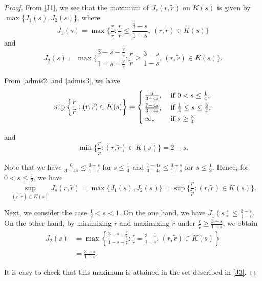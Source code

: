 \documentclass[letterpaper, 11pt,  reqno]{amsart}
\newcommand{\1}{\hspace{0.5mm}\text{I}\hspace{0.5mm}}
\newcommand{\noi}{\noindent}
\newcommand{\wt}{\widetilde}
\numberwithin{equation}{section}
\numberwithin{theorem}{section}
\begin{document}
  
 \begin{proof} 
From \eqref{J1}, we see that 
the maximum of $J_s(r, \wt r)$ on $K(s)$ is given by $\max\{J_1(s),J_2(s) \}$, 
where 
\[ J_1(s)= \max \bigg\{ \frac{r}{\wt r} : \frac{r}{\wt r} \le \frac{3-s}{1-s}, \, (r,\wt r) \in K(s) \bigg\} \] 
and 
\[J_2(s) = \max \bigg\{ \frac{3-s-\frac2{\wt r}}{1-s-\frac2{r}} :   
 \frac{r}{\wt r} \ge \frac{3-s}{1-s}, \, (r,\wt r ) \in K(s) \bigg\}. \]  


From \eqref{admis2} and \eqref{admis3}, we have
\[ \sup\bigg\{ \frac{r}{\wt r}: (r,\wt r) \in K(s) \bigg\} 
=  \begin{cases}
\rule[-2.5mm]{0pt}{0pt}
 \frac{6}{3-4s},        & \text{ if } 0<s \le \frac14,  \\
\rule[-2mm]{0pt}{0pt}
\frac{7-4s}{3-4s},    & \text{ if } \frac14 \le s \le \frac34,  \\
\infty,  & \text{ if } s \ge \frac34
\end{cases}
\]



\noi
and  
\[ \min\bigg\{ \frac{r}{\wt r}: (r,\wt r) \in K(s)\bigg\} =  2-s . \] 


\noi
Note that we have 
$ \frac{6}{3-4s} \le \frac{3-s}{1-s} $ for $ s \le \frac14$ and 
$\frac{7-4s}{3-4s} \le \frac{3-s}{1-s}$ for $ s\le \frac12$.
Hence,  for $0<  s\le \frac12 $, we have
 \[  \sup_{(r, \wt r) \in K(s)}  J_s(r, \wt r)
=   \max\{J_1(s), J_2(s)\} = \sup\bigg\{ \frac{r}{\wt r} : (r,\wt r) \in K(s)\bigg\}.   \]



Next, we consider the case  $\frac12 < s < 1$. 
On the one hand, we have  $J_1(s) \le \frac{3-s}{1-s}$.
On the other hand, by minimizing $r$ and maximizing $\wt r$ under   $\frac{r}{\wt r} \ge \frac{3-s}{1-s}$,
we obtain
\begin{align*}
J_2(s)
& =  \max\left\{ \frac{3-s-\frac2{\wt r}}{1-s-\frac2r}:\frac{r}{\wt r} = \frac{3-s}{1-s} , \,  (r,\wt r) \in K(s) \right\}
\\ 
& =  \frac{3-s}{1-s}. 
\end{align*}


\noi
It is easy to check that  this maximum is attained 
in the set described in \eqref{J3}.
\end{proof} 
 
\end{document}
